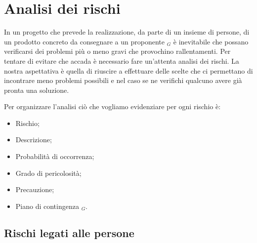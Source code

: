 \chapter{Analisi dei rischi}

In un progetto che prevede la realizzazione, da parte di un insieme di persone, di un prodotto concreto 
da consegnare a un proponente $_G$ è inevitabile che possano verificarsi dei problemi più o meno gravi che
provochino rallentamenti. Per tentare di evitare che accada è necessario fare un'attenta analisi dei
rischi. La nostra aspettativa è quella di riuscire a effettuare delle scelte che ci permettano di
incontrare meno problemi possibili e nel caso se ne verifichi qualcuno avere già pronta una soluzione.

Per organizzare l'analisi ciò che vogliamo evidenziare per ogni rischio è:
\begin{itemize}
    \item Rischio;
    \item Descrizione;
    \item Probabilità di occorrenza;
    \item Grado di pericolosità;
    \item Precauzione;
    \item Piano di contingenza $_G$.
\end{itemize}

\newpage
\section{Rischi legati alle persone}


